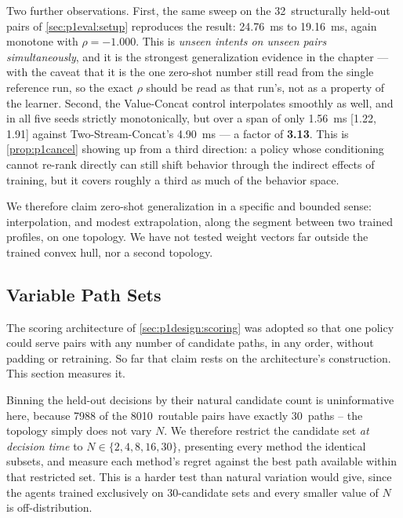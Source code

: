 Two further observations. First, the same sweep on the 32~structurally held-out pairs of
\cref{sec:p1eval:setup} reproduces the result: \SI{24.76}{\milli\second} to \SI{19.16}{\milli\second},
again monotone with $\rho = -1.000$. This is \emph{unseen intents on unseen pairs simultaneously}, and it
is the strongest generalization evidence in the chapter --- with the caveat that it is the one zero-shot
number still read from the single reference run, so the exact $\rho$ should be read as that run's, not as
a property of the learner. Second, the Value-Concat control interpolates smoothly as well, and in all
five seeds strictly monotonically, but over a span of only \SI{1.56}{\milli\second} [1.22, 1.91] against
Two-Stream-Concat's \SI{4.90}{\milli\second} --- a factor of \textbf{3.13}. This is \cref{prop:p1cancel}
showing up from a third direction: a policy whose conditioning cannot re-rank directly can still shift
behavior through the indirect effects of training, but it covers roughly a third as much of the behavior
space.

We therefore claim zero-shot generalization in a specific and bounded sense: interpolation, and modest
extrapolation, along the segment between two trained profiles, on one topology. We have not tested
weight vectors far outside the trained convex hull, nor a second topology.

\subsection{Variable Path Sets}
\label{sec:p1eval:dynamic}

The scoring architecture of \cref{sec:p1design:scoring} was adopted so that one policy could serve pairs
with any number of candidate paths, in any order, without padding or retraining. So far that claim rests
on the architecture's construction. This section measures it.

Binning the held-out decisions by their natural candidate count is uninformative here, because 7988 of
the 8010~routable pairs have exactly 30~paths -- the topology simply does not vary $N$. We therefore
restrict the candidate set \emph{at decision time} to $N \in \{2, 4, 8, 16, 30\}$, presenting every
method the identical subsets, and measure each method's regret against the best path available within
that restricted set. This is a harder test than natural variation would give, since the agents trained
exclusively on 30-candidate sets and every smaller value of $N$ is off-distribution.

